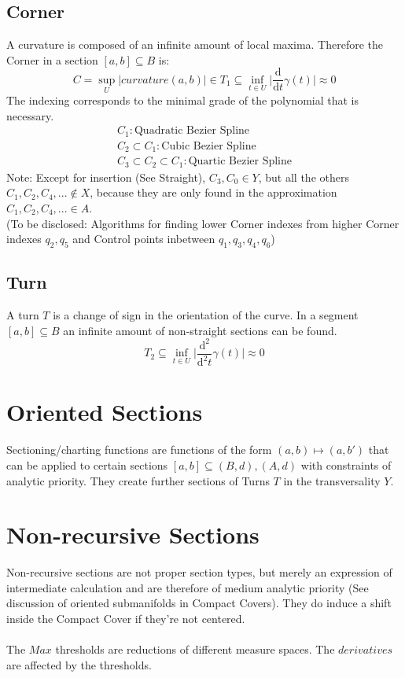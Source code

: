 \documentclass{report}
\begin{document}
\subsection{Corner}
A curvature is composed of an infinite amount of local maxima. Therefore the Corner in a section $[a,b] \subseteq B$ is:
\begin{equation}
C = \sup_{U}\lvert curvature(a,b) \rvert \in T_{1} \subseteq \inf_{t \in U} \lvert \frac{\mathrm{d}}{\mathrm{d}t}\gamma(t) \rvert \approx 0
\end{equation}
The indexing corresponds to the minimal grade of the polynomial that is necessary.
\begin{align}
C_{1} : \text{Quadratic Bezier Spline}\\
C_{2} \subset C_{1} : \text{Cubic Bezier Spline}\\
C_{3} \subset C_{2} \subset C_{1} : \text{Quartic Bezier Spline}
\end{align}
Note: Except for insertion (See Straight), $C_{3},C_{0} \in Y$, but all the others $C_{1},C_{2},C_{4},... \not\in X$, because they are only found in the approximation $C_{1},C_{2},C_{4},... \in A$.\\
(To be disclosed: Algorithms for finding lower Corner indexes from higher Corner indexes $q_{2},q_{5}$ and Control points inbetween $q_{1},q_{3},q_{4},q_{6}$)

\subsection{Turn}
A turn $T$ is a change of sign in the orientation of the curve. In a segment $[a,b] \subseteq B$ an infinite amount of non-straight sections can be found.
\begin{equation}
T_{2} \subseteq \inf_{t \in U} \lvert \frac{\mathrm{d}^2}{\mathrm{d}^2t}\gamma(t) \rvert \approx 0
\end{equation}

\section*{Oriented Sections}
Sectioning/charting functions are functions of the form $(a,b) \mapsto (a,b')$ that can be applied to certain sections $[a,b] \subseteq (B,d),(A,d)$ with constraints of analytic priority. They create further sections of Turns $T$ in the transversality $Y$.

\section{Non-recursive Sections}
Non-recursive sections are not proper section types, but merely an expression of intermediate calculation and are therefore of medium analytic priority (See discussion of oriented submanifolds in Compact Covers). They do induce a shift inside the Compact Cover if they're not centered.\\\\
The $Max$ thresholds are reductions of different measure spaces. The $derivatives$ are affected by the thresholds.
\end{document}
